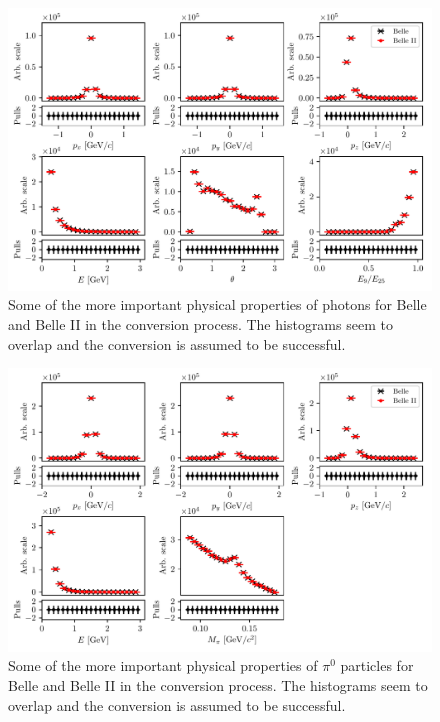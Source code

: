 \begin{figure}[H]
	\centering
	\captionsetup{width=0.8\linewidth}
	\includegraphics[width=\linewidth]{fig/b2bii_gammas}
	\caption{Some of the more important physical properties of photons for Belle and Belle II in the conversion process. The histograms seem to overlap and the conversion is assumed to be successful.}
	\label{fig:b2bii_gammas}
\end{figure}

\begin{figure}[H]
	\centering
	\captionsetup{width=0.8\linewidth}
	\includegraphics[width=\linewidth]{fig/b2bii_pi0s}
	\caption{Some of the more important physical properties of $\pi^0$ particles for Belle and Belle II in the conversion process. The histograms seem to overlap and the conversion is assumed to be successful.}
	\label{fig:b2bii_pi0s}
\end{figure}

